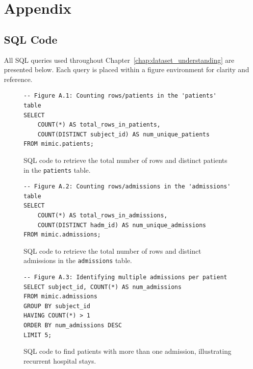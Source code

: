 \chapter{Appendix}
\label{chap:appendix}

\section{SQL Code}
\noindent
All SQL queries used throughout Chapter~\ref{chap:dataset_understanding} are presented below. Each query is placed within a figure environment for clarity and reference.

\begin{figure}[H]
\centering
\begin{minipage}{\textwidth}
\begin{verbatim}
-- Figure A.1: Counting rows/patients in the 'patients' table
SELECT
    COUNT(*) AS total_rows_in_patients,
    COUNT(DISTINCT subject_id) AS num_unique_patients
FROM mimic.patients;
\end{verbatim}
\end{minipage}
\caption{SQL code to retrieve the total number of rows and distinct patients in the \texttt{patients} table.}
\label{fig:sql1_patient_rows}
\end{figure}

\begin{figure}[H]
\centering
\begin{minipage}{\textwidth}
\begin{verbatim}
-- Figure A.2: Counting rows/admissions in the 'admissions' table
SELECT
    COUNT(*) AS total_rows_in_admissions,
    COUNT(DISTINCT hadm_id) AS num_unique_admissions
FROM mimic.admissions;
\end{verbatim}
\end{minipage}
\caption{SQL code to retrieve the total number of rows and distinct admissions in the \texttt{admissions} table.}
\label{fig:sql2_admission_rows}
\end{figure}

\begin{figure}[H]
\centering
\begin{minipage}{\textwidth}
\begin{verbatim}
-- Figure A.3: Identifying multiple admissions per patient
SELECT subject_id, COUNT(*) AS num_admissions
FROM mimic.admissions
GROUP BY subject_id
HAVING COUNT(*) > 1
ORDER BY num_admissions DESC
LIMIT 5;
\end{verbatim}
\end{minipage}
\caption{SQL code to find patients with more than one admission, illustrating recurrent hospital stays.}
\label{fig:sql3_multiple_admissions}
\end{figure}

